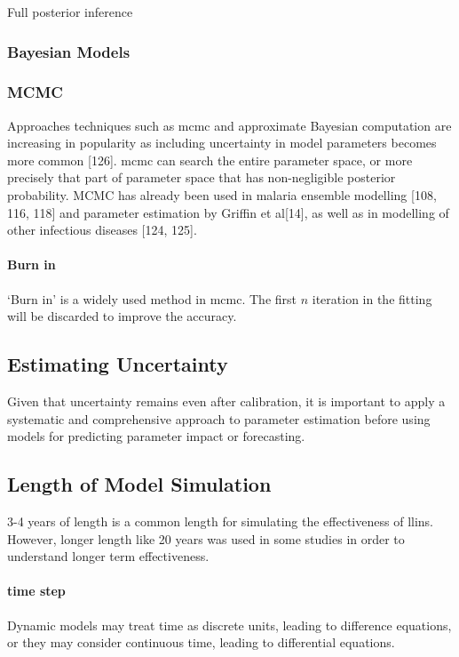 \documentclass[a4paper, 12pt, twoside]{article}
\begin{document}
Full posterior inference


\subsubsection{Bayesian Models}

\subsubsection{MCMC}

Approaches techniques such as \gls{mcmc} and approximate Bayesian computation are increasing in popularity as including uncertainty in model parameters becomes more common [126].
\gls{mcmc} can search the entire parameter space, or more precisely that part of parameter space that has non-negligible posterior probability.
MCMC has already been used in malaria ensemble modelling [108, 116, 118] and parameter estimation by Griffin et al[14], as well as in modelling of other infectious diseases [124, 125].

\paragraph{Burn in}%
\label{par:burn_in}
`Burn in' is a widely used method in \gls{mcmc}. The first $n$ iteration in the fitting will be discarded to improve the accuracy.

\subsection{Estimating Uncertainty}
Given that uncertainty remains even after calibration, it is important to apply a systematic and comprehensive approach to parameter estimation before using models for predicting parameter impact or forecasting.

\subsection{Length of Model Simulation}
3-4 years of length is a common length for simulating the effectiveness of \gls{llins}. However, longer length like 20 years was used in some studies in order to understand longer term effectiveness\cite{Walker2016}.

\paragraph{time step}%
\label{par:time_step}
Dynamic models may treat time as discrete units, leading to difference equations, or they may consider continuous time, leading to differential equations.
\end{document}
